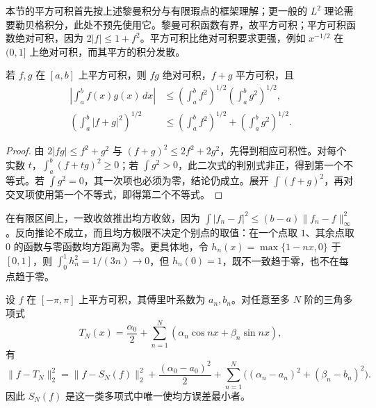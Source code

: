 \documentclass[UTF8,12pt,a4paper,fontset=fandol]{ctexbook}
\begin{document}
本节的平方可积首先按上述黎曼积分与有限瑕点的框架理解；更一般的 $L^2$ 理论需要勒贝格积分，此处不预先使用它。黎曼可积函数有界，故平方可积；平方可积函数绝对可积，因为 $2|f|\leq1+f^2$。平方可积比绝对可积要求更强，例如 $x^{-1/2}$ 在 $(0,1]$ 上绝对可积，而其平方的积分发散。

\begin{proposition}[积分型柯西不等式与三角不等式]
\label{prop:square-integral-inequalities}
若 $f,g$ 在 $[a,b]$ 上平方可积，则 $fg$ 绝对可积，$f+g$ 平方可积，且
\begin{align}
    \left|\int_a^bf(x)g(x)\,dx\right|
       &\leq\left(\int_a^bf^2\right)^{1/2}
              \left(\int_a^bg^2\right)^{1/2},
       \label{eq:integral-cauchy-schwarz-fourier}\\
    \left(\int_a^b|f+g|^2\right)^{1/2}
       &\leq\left(\int_a^bf^2\right)^{1/2}
                 +\left(\int_a^bg^2\right)^{1/2}.
       \label{eq:integral-triangle-fourier}
\end{align}
\end{proposition}

\begin{proof}
由 $2|fg|\leq f^2+g^2$ 与 $(f+g)^2\leq2f^2+2g^2$，先得到相应可积性。对每个实数 $t$，$\int_a^b(f+tg)^2\geq0$；若 $\int g^2>0$，此二次式的判别式非正，得到第一个不等式。若 $\int g^2=0$，其一次项也必须为零，结论仍成立。展开 $\int(f+g)^2$，再对交叉项使用第一个不等式，即得第二个不等式。
\end{proof}

在有限区间上，一致收敛推出均方收敛，因为 $\int|f_n-f|^2\leq(b-a)\|f_n-f\|_\infty^2$。反向推论不成立，而且均方极限不决定个别点的取值：在一个点取 $1$、其余点取 $0$ 的函数与零函数均方距离为零。更具体地，令 $h_n(x)=\max\{1-nx,0\}$ 于 $[0,1]$，则 $\int_0^1h_n^2=1/(3n)\to0$，但 $h_n(0)=1$，既不一致趋于零，也不在每点趋于零。

\begin{theorem}[傅里叶部分和的最佳均方逼近]
\label{thm:fourier-best-square-approximation}
设 $f$ 在 $[-\pi,\pi]$ 上平方可积，其傅里叶系数为 $a_n,b_n$。对任意至多 $N$ 阶的三角多项式
\[
    T_N(x)=\frac{\alpha_0}{2}
             +\sum_{n=1}^N(\alpha_n\cos nx+\beta_n\sin nx),
\]
有
\begin{equation}
    \|f-T_N\|_2^2=\|f-S_N(f)\|_2^2
            +\frac{(\alpha_0-a_0)^2}{2}
            +\sum_{n=1}^N\bigl((\alpha_n-a_n)^2+(\beta_n-b_n)^2\bigr).
    \label{eq:fourier-square-error-decomposition}
\end{equation}
因此 $S_N(f)$ 是这一类多项式中唯一使均方误差最小者。
\end{theorem}
\end{document}
